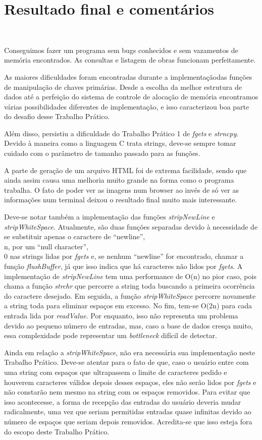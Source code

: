 \documentclass{article}
\begin{document}
\section{Resultado final e comentários}\

Conseguimos fazer um programa sem bugs conhecidos e sem vazamentos de memória encontrados. As consultas e listagem de obras funcionam perfeitamente.

As maiores dificuldades foram encontradas durante a implementaçãodas funções de manipulação de chaves primárias. Desde a escolha da melhor estrutura de dados até a perfeição do sistema de controle de alocação de memória encontramos várias possibilidades diferentes de implementação, e isso caracterizou boa parte do desafio desse Trabalho Prático.

Além disso, persistiu a dificuldade do Trabalho Prático 1 de \textit{fgets} e \textit{strncpy}. Devido à maneira como a linguagem C trata strings, deve-se sempre tomar cuidado com o parâmetro de tamanho passado para as funções.

A parte de geração de um arquivo HTML foi de extrema facilidade, sendo que ainda assim causa uma melhoria muito grande na forma como o programa trabalha. O fato de poder ver as imagens num browser ao invés de só ver as informações num terminal deixou o resultado final muito mais interessante.

Deve-se notar também a implementação das funções \textit{stripNewLine} e \textit{stripWhiteSpace}. Atualmente, são duas funções separadas devido à necessidade de se substituir apenas o caractere de ``newline'', \\n, por um ``null character'', \\0 nas strings lidas por \textit{fgets} e, se nenhum ``newline'' for encontrado, chamar a função \textit{flushBuffer}, já que isso indica que há caracteres não lidos por \textit{fgets}. A implementação de \textit{stripNewLine} tem uma performance de O(n) no pior caso, pois chama a função \textit{strchr} que percorre a string toda buscando a primeira ocorrência do caractere desejado. Em seguida, a função \textit{stripWhiteSpace} percorre novamente a string toda para eliminar espaços em excesso. No fim, tem-se O(2n) para cada entrada lida por \textit{readValue}. Por enquanto, isso não representa um problema devido ao pequeno número de entradas, mas, caso a base de dados cresça muito, essa complexidade pode representar um \textit{bottleneck} difícil de detectar.

Ainda em relação a \textit{stripWhiteSpace}, não era necessária sua implementação neste Trabalho Prático. Deve-se atentar para o fato de que, caso o usuário entre com uma string com espaços que ultrapassem o limite de caracteres pedido e houverem caracteres válidos depois desses espaços, eles não serão lidos por \textit{fgets} e não constarão nem mesmo na string com os espaços removidos. Para evitar que isso acontecesse, a forma de recepção das entradas do usuário deveria mudar radicalmente, uma vez que seriam permitidas entradas quase infinitas devido ao número de espaços que seriam depois removidos. Acredita-se que isso esteja fora do escopo deste Trabalho Prático.
\end{document}
